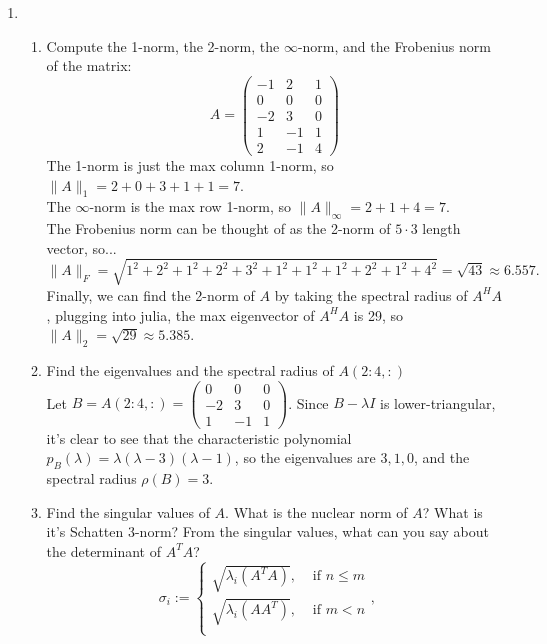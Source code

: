 \documentclass[11pt]{article}
\newcommand{\n}{\vspace{0.2cm}}
\begin{document}
\begin{enumerate}
	\item \begin{enumerate}[label=(\alph*)]
		      \item Compute the 1-norm, the 2-norm, the \(\infty\)-norm, and the Frobenius norm of the matrix:
		            \[A = \begin{pmatrix} -1 & 2 & 1 \\ 0 & 0 & 0 \\ -2 & 3 & 0 \\ 1 & -1 & 1 \\ 2 & -1 & 4 \end{pmatrix}\]
		            The 1-norm is just the max column 1-norm, so \(\lVert A \rVert_1 = 2 + 0 + 3 + 1 + 1 = 7\). \n\\
		            The \(\infty\)-norm is the max row 1-norm, so \(\lVert A \rVert_\infty = 2 + 1 + 4 = 7\). \n\\
		            The Frobenius norm can be thought of as the 2-norm of \(5 \cdot 3\) length vector, so...
		            \[\lVert A \rVert_F = \sqrt{1^2 + 2^2 + 1^2 + 2^2 + 3^2 + 1^2 + 1^2 + 1^2 + 2^2 + 1^2 + 4^2} = \sqrt{43} \approx 6.557.\]
		            Finally, we can find the 2-norm of \(A\) by taking the spectral radius of \(A^HA\), plugging into julia, the max eigenvector of \(A^HA\) is 29, so \(\lVert A \rVert_2 = \sqrt{29} \approx 5.385\).
		      \item Find the eigenvalues and the spectral radius of \(A(2:4,:)\) \n\\
		            Let \(B = A(2:4,:) = \begin{pmatrix} 0 & 0 & 0 \\ -2 & 3 & 0 \\ 1 & -1 & 1 \end{pmatrix}\).  Since \(B - \lambda I\) is lower-triangular, it's clear to see that the characteristic polynomial \(p_B(\lambda) = \lambda (\lambda - 3) (\lambda - 1)\), so the eigenvalues are \(3,1,0\), and the spectral radius \(\rho(B) = 3\).
		      \item Find the singular values of \(A\).  What is the nuclear norm of \(A\)?  What is it's Schatten 3-norm?  From the singular values, what can you say about the determinant of \(A^TA\)?
		            \[
			            \sigma_i := \begin{cases}
				            \sqrt{\lambda_i(A^TA)}, & \text{ if } n \leq m \\
				            \sqrt{\lambda_i(AA^T)}, & \text{ if } m < n    \\
			            \end{cases}, \quad
\]
\end{enumerate}
\end{enumerate}
\end{document}
